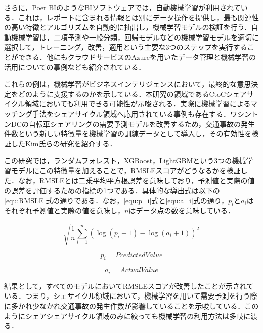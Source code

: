           \par さらに，Poer BIのようなBIソフトウェアでは，自動機械学習が利用されている．これは，レポートに含まれる情報とは別にデータ操作を提供し，最も関連性の高い特徴とアルゴリズムを自動的に抽出し，機械学習モデルの検証を行う．自動機械学習は，二項予測や一般分類，回帰モデルなどの機械学習モデルを適切に選択して，トレーニング，改善，適用という主要な3つのステップを実行することができる．他にもクラウドサービスのAzureを用いたデータ管理と機械学習の活用についての事例なども紹介されている．
          \par これらの例は，機械学習がビジネスインテリジェンスにおいて，最終的な意思決定をどのように支援するのかを示している．本研究の領域であるCtoCシェアサイクル領域においても利用できる可能性が示唆される．実際に機械学習によるマッチング手法をシェアサイクル領域へ応用されている事例も存在する．ワシントンDCの自転車シェアリングの需要予測モデルを改善するため，交通事故の発生件数という新しい特徴量を機械学習の訓練データとして導入し，その有効性を検証したKim氏らの研究を紹介する．
          \par この研究では，ランダムフォレスト，XGBoost，LightGBMという3つの機械学習モデルにこの特徴量を加えることで，RMSLEスコアがどうなるかを検証した．なお，RMSLEとは二乗平均平方根誤差を意味しており，予測値と実際の値の誤差を評価するための指標の1つである．具体的な導出式は以下の\ref{equ:RMSLE}式の通りである．なお，\ref{equ:p_i}式と\ref{equ:a_i}式の通り，$p_i$と$a_i$はそれぞれ予測値と実際の値を意味し，$n$はデータ点の数を意味している．

          \begin{equation}\label{equ:RMSLE}
            \sqrt{\frac{1}{n}\sum_{i=1}^n(\log(p_i + 1) - \log(a_i + 1))^2}
          \end{equation}
          
          \begin{equation}\label{equ:p_i}
            p_i = PredictedValue
          \end{equation}

          \begin{equation}\label{equ:a_i}
            a_i = ActualValue
          \end{equation}

          \par 結果として，すべてのモデルにおいてRMSLEスコアが改善したことが示されている．つまり，シェサイクル領域において，機械学習を用いて需要予測を行う際に多かれ少なかれ交通事故の発生件数が影響していることを示唆している．このようにシェアシェアサイクル領域のみに絞っても機械学習の利用方法は多岐に渡る．
          
